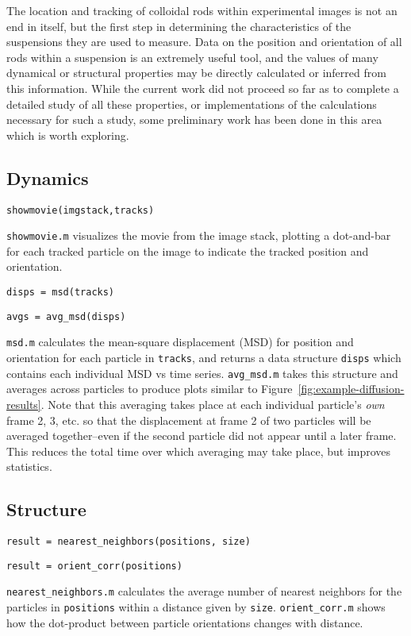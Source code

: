The location and tracking of colloidal rods within experimental images is not an end in itself, but the
first step in determining the characteristics of the suspensions they are used to measure.  Data on the 
position and orientation of all rods within a suspension is an extremely useful tool, and the values of many
dynamical or structural properties may be directly calculated or inferred from this information.
While the current work did not proceed so far as to complete a detailed study of all these properties, or 
implementations of the calculations necessary for such a study, some preliminary work has been done in this
area which is worth exploring.

\subsection{Dynamics}


\texttt{showmovie(imgstack,tracks)}

\texttt{showmovie.m} visualizes the
movie from the image stack, plotting a dot-and-bar for each tracked particle on the image to indicate 
the tracked position and orientation.

\texttt{disps = msd(tracks)}

\texttt{avgs = avg\_msd(disps)}

\texttt{msd.m} calculates the mean-square displacement (MSD) for position and orientation for each particle 
in \texttt{tracks}, and returns a data structure \texttt{disps} which contains each individual MSD vs time 
series.  \texttt{avg\_msd.m} takes this structure and averages across particles to produce plots similar 
to Figure~\ref{fig:example-diffusion-results}. Note that this averaging takes place at each 
individual particle's \textit{own} frame 2, 3, etc. so that the displacement at frame 2 of two particles 
will be averaged together--even if the second particle did not appear until a later frame.  This reduces the
total time over which averaging may take place, but improves statistics.

\subsection{Structure}
\label{sec:structure-calcs}

\texttt{result = nearest\_neighbors(positions, size)}


\texttt{result = orient\_corr(positions)}

\texttt{nearest\_neighbors.m} calculates the average number of nearest neighbors for the particles in 
\texttt{positions} within a distance given by \texttt{size}. 
\texttt{orient\_corr.m} shows how the 
dot-product between particle orientations changes with distance.

